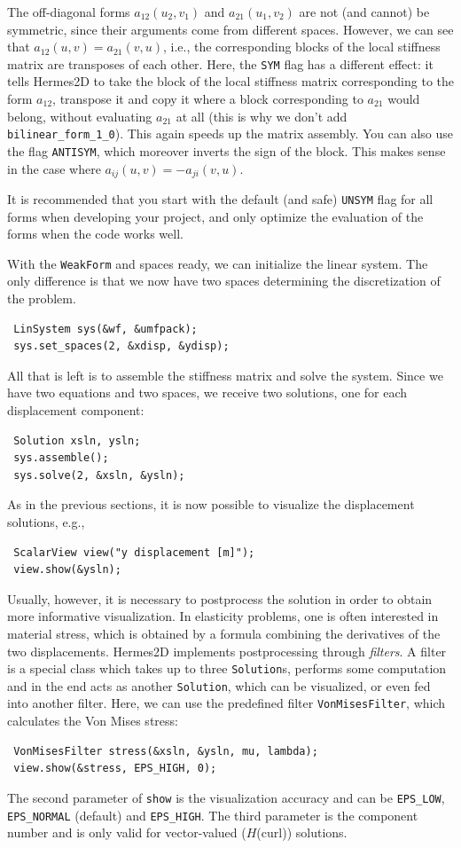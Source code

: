 \documentclass[11pt]{article}
\newcommand{\bfH}{\mbox{\boldmath $H$}}
\def\Hcurl{{\bfH({\rm curl})}}
\begin{document}
The off-diagonal forms $a_{12}(u_2, v_1)$ and $a_{21}(u_1, v_2)$ are not
(and cannot) be symmetric, since their arguments come from different spaces.
However, we can see that $a_{12}(u, v) = a_{21}(v, u)$, i.e., the corresponding blocks
of the local stiffness matrix are transposes of each other. Here, the {\tt SYM} flag
has a different effect: it tells Hermes2D to take the block of the local stiffness
matrix corresponding to the form $a_{12}$, transpose it and copy it where a block
corresponding to $a_{21}$ would belong, without evaluating $a_{21}$ at all (this is why
we don't add {\tt bilinear\_form\_1\_0}). This again speeds up the matrix assembly.
You can also use the flag {\tt ANTISYM}, which moreover inverts the sign of the block.
This makes sense in the case where $a_{ij}(u, v) = -a_{ji}(v, u)$.

It is recommended that you start with the default (and safe) {\tt UNSYM} flag for all
forms when developing your project, and only optimize the evaluation of the forms when
the code works well.

With the {\tt WeakForm} and spaces ready, we can initialize the linear system.
The only difference is that we now have two spaces determining the discretization
of the problem.

\begin{lstlisting}
 LinSystem sys(&wf, &umfpack);
 sys.set_spaces(2, &xdisp, &ydisp);
\end{lstlisting}

All that is left is to assemble the stiffness matrix and solve the system.
Since we have two equations and two spaces, we receive two solutions, one for each
displacement component:
\begin{lstlisting}
 Solution xsln, ysln;
 sys.assemble();
 sys.solve(2, &xsln, &ysln);
\end{lstlisting}

\smallskip As in the previous sections, it is now possible to visualize the displacement
solutions, e.g.,
\begin{lstlisting}
 ScalarView view("y displacement [m]");
 view.show(&ysln);
\end{lstlisting}
Usually, however, it is necessary to postprocess the solution in order to obtain more
informative visualization. In elasticity problems, one is often interested in material
stress, which is obtained by a formula combining the derivatives of the two displacements.
Hermes2D implements postprocessing through \emph{filters}. A filter is a special class
which takes up to three \verb"Solution"s, performs some computation and in the end acts
as another \verb"Solution", which can be visualized, or even fed into another filter.
Here, we can use the predefined filter \verb"VonMisesFilter", which calculates the
Von Mises stress:
\begin{lstlisting}
 VonMisesFilter stress(&xsln, &ysln, mu, lambda);
 view.show(&stress, EPS_HIGH, 0);
\end{lstlisting}
The second parameter of \verb"show" is the visualization accuracy and can be
\verb"EPS_LOW", \verb"EPS_NORMAL" (default) and \verb"EPS_HIGH". The third parameter is
the component number and is only valid for vector-valued (\Hcurl) solutions.
\end{document}
